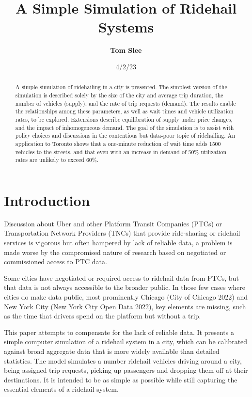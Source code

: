 \documentclass[
  letterpaper,
]{article}
\title{A Simple Simulation of Ridehail Systems}
\author{
\textbf{Tom Slee}\\}
\date{4/2/23}
\renewcommand*\contentsname{Table of contents}
\newcommand\contentsname{Table of contents}
\begin{document}
\maketitle
\begin{abstract}
A simple simulation of ridehailing in a city is presented. The simplest
version of the simulation is described solely by the size of the city
and average trip duration, the number of vehicles (supply), and the rate
of trip requests (demand). The results enable the relationships among
these parameters, as well as wait times and vehicle utilization rates,
to be explored. Extensions describe equilibration of supply under price
changes, and the impact of inhomogeneous demand. The goal of the
simulation is to assist with policy choices and discussions in the
contentious but data-poor topic of ridehailing. An application to
Toronto shows that a one-minute reduction of wait time adds 1500
vehicles to the streets, and that even with an increase in demand of
50\% utilization rates are unlikely to exceed 60\%.
\end{abstract}
\ifdefined\Shaded\renewenvironment{Shaded}{\begin{tcolorbox}[boxrule=0pt, breakable, sharp corners, enhanced, interior hidden, frame hidden, borderline west={3pt}{0pt}{shadecolor}]}{\end{tcolorbox}}\fi

\renewcommand*\contentsname{Contents}
{
\hypersetup{linkcolor=}
\setcounter{tocdepth}{3}
\tableofcontents
}
\hypertarget{introduction}{%
\section{Introduction}\label{introduction}}

Discussion about Uber and other Platform Transit Companies (PTCs) or
Transportation Network Providers (TNCs) that provide ride-sharing or
ridehail services is vigorous but often hampered by lack of reliable
data, a problem is made worse by the compromised nature of research
based on negotiated or commissioned access to PTC data.

Some cities have negotiated or required access to ridehail data from
PTCs, but that data is not always accessible to the broader public. In
those few cases where cities do make data public, most prominently
Chicago (City of Chicago 2022) and New York City (New York City Open
Data 2022), key elements are missing, such as the time that drivers
spend on the platform but without a trip.

This paper attempts to compensate for the lack of reliable data. It
presents a simple computer simulation of a ridehail system in a city,
which can be calibrated against broad aggregate data that is more widely
available than detailed statistics. The model simulates a number
ridehail vehicles driving around a city, being assigned trip requests,
picking up passengers and dropping them off at their destinations. It is
intended to be as simple as possible while still capturing the essential
elements of a ridehail system.
\end{document}
